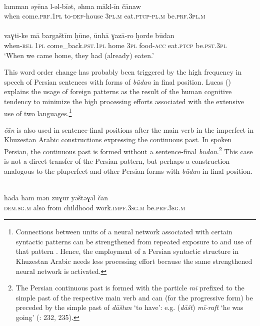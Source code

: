 \documentclass[output=paper,nonflat]{langsci/langscibook}
\begin{document}
\ea {}\\
\gll lamman əyēna l-əl-bīət, əhma mākl-īn čānaw\\
     when come.\textsc{prf.1pl} to-\textsc{def}-house 3\textsc{pl}.\textsc{m} eat.\textsc{ptcp-pl.m} be.\textsc{prf}.\textsc{3pl.m}\\
 
\\
\gll vaɣti-ke mā bargaštīm ḫūne, ūnhā ɣazā-ro ḫorde būdan  \\
     when-\textsc{rel} \textsc{1pl} come\_back.\textsc{pst}.\textsc{1pl} home 3\textsc{pl} food-\textsc{acc} eat.\textsc{ptcp} be.\textsc{pst}.\textsc{3pl}\\
\glt ‘When we came home, they had (already) eaten.’
\z
\z

This word order change has probably been triggered by the high frequency in speech of Persian sentences with forms of \textit{būdan} in final position. Lucas (\citeyear[295]{Lucas2012}) explains the usage of foreign patterns as the result of the human cognitive tendency to minimize the high processing efforts associated with the extensive use of two languages.\footnote{{Connections between units of a neural network associated with certain syntactic patterns can be strengthened from repeated exposure to and use of that pattern} {\citep[291]{Lucas2012}. Hence, the employment of a Persian syntactic structure in Khuzestan Arabic needs less processing effort because the same strengthened neural network is activated.}}

\textit{čān} is also used in sentence-final positions after the main verb in the imperfect in Khuzestan Arabic constructions expressing the continuous past. In spoken Persian, the continuous past is formed without a sentence-final \textit{būdan}.\footnote{The Persian continuous past is formed with the particle \textit{mī} prefixed to the simple past of the respective main verb and can (for the progressive form) be preceded by the simple past of \textit{dāštan} ‘to have’: e.g. (\textit{dāšt}) \textit{mī-raft} ‘he was going’ (\citealt{Majidi1990}: 232, 235).} This case is not a direct transfer of the Persian pattern, but perhaps a construction analogous to the pluperfect and other Persian forms with \textit{būdan} in final position. 

\ea
{}\\
\gll hāda ham mən zuɣur yəštəɣəl čān  \\
     \textsc{dem}.\textsc{sg}.\textsc{m} also from childhood work.\textsc{impf.3sg.m} be.\textsc{prf.3sg.m}\\
 
\end{document}
